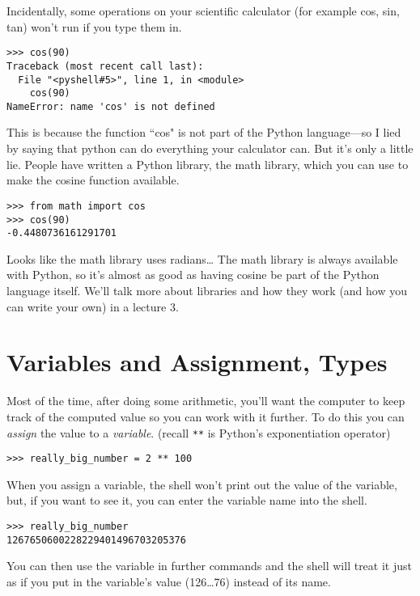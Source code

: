 Incidentally, some operations on your scientific calculator (for example cos, sin, tan) won’t run if you type them in. 

\begin{lstlisting}[numbers=none]
>>> cos(90)
Traceback (most recent call last):
  File "<pyshell#5>", line 1, in <module>
    cos(90)
NameError: name 'cos' is not defined
\end{lstlisting}

This is because the function ``cos" is not part of the Python language—so I lied by saying that python can do everything your calculator can. But it’s only a little lie. People have written a Python library, the math library, which you can use to make the cosine function available.

\begin{lstlisting}[numbers=none]
>>> from math import cos
>>> cos(90)
-0.4480736161291701   
\end{lstlisting}   

Looks like the math library uses radians… The math library is always available with Python, so it’s almost as good as having cosine be part of the Python language itself. We’ll talk more about libraries and how they work (and how you can write your own) in a lecture 3.


\section*{Variables and Assignment, Types}

Most of the time, after doing some arithmetic, you’ll want the computer to keep track of the computed value so you can work with it further. To do this you can \emph{assign} the value to a \emph{variable}. (recall \texttt{**} is Python’s exponentiation operator)

\begin{lstlisting}[numbers=none]
>>> really_big_number = 2 ** 100
\end{lstlisting}

When you assign a variable, the shell won’t print out the value of the variable, but, if you want to see it, you can enter the variable name into the shell. 

\begin{lstlisting}[numbers=none]
>>> really_big_number
1267650600228229401496703205376
\end{lstlisting}

You can then use the variable in further commands and the shell will treat it just as if you put in the variable’s value (126…76) instead of its name.

